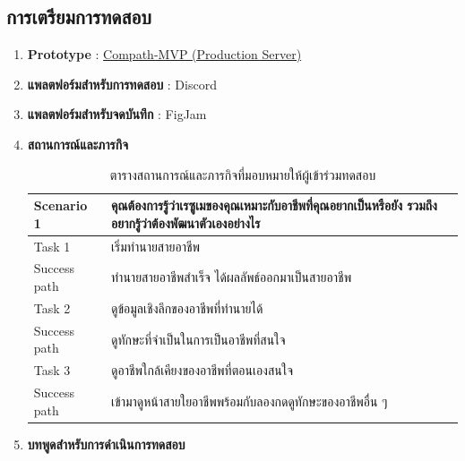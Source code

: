 \subsection{การเตรียมการทดสอบ}
\begin{enumerate}
    \item \textbf{Prototype} : \href{https://compath-cpe.web.app/}{Compath-MVP (Production Server)}
    \item \textbf{แพลตฟอร์มสำหรับการทดสอบ} : Discord
    \item \textbf{แพลตฟอร์มสำหรับจดบันทึก} : FigJam
    \item \textbf{สถานการณ์และภารกิจ}
          \begin{table}[H]
              \caption{ตารางสถานการณ์และภารกิจที่มอบหมายให้ผู้เข้าร่วมทดสอบ}
              \label{tab:scenarioUT}
              \begin{tabularx}{\textwidth}{|l|X|}
                  \hline
                  \textbf{Scenario 1} & \textbf{คุณต้องการรู้ว่าเรซูเมของคุณเหมาะกับอาชีพที่คุณอยากเป็นหรือยัง รวมถึงอยากรู้ว่าต้องพัฒนาตัวเองอย่างไร} \\ \hline
                  Task 1              & เริ่มทำนายสายอาชีพ                                                                          \\ \hline
                  Success path        & ทำนายสายอาชีพสำเร็จ ได้ผลลัพธ์ออกมาเป็นสายอาชีพ                                                  \\ \hline
                  Task 2              & ดูข้อมูลเชิงลึกของอาชีพที่ทำนายได้                                                                \\ \hline
                  Success path        & ดูทักษะที่จำเป็นในการเป็นอาชีพที่สนใจ                                                             \\ \hline
                  Task 3              & ดูอาชีพใกล้เคียงของอาชีพที่ตอนเองสนใจ                                                          \\ \hline
                  Success path        & เข้ามาดูหน้าสายใยอาชีพพร้อมกับลองกดดูทักษะของอาชีพอื่น ๆ                                           \\ \hline
              \end{tabularx}
          \end{table}
    \item \textbf{บทพูดสำหรับการดำเนินการทดสอบ}
          \begin{figure}[H]\centering

\end{figure}
\end{enumerate}
